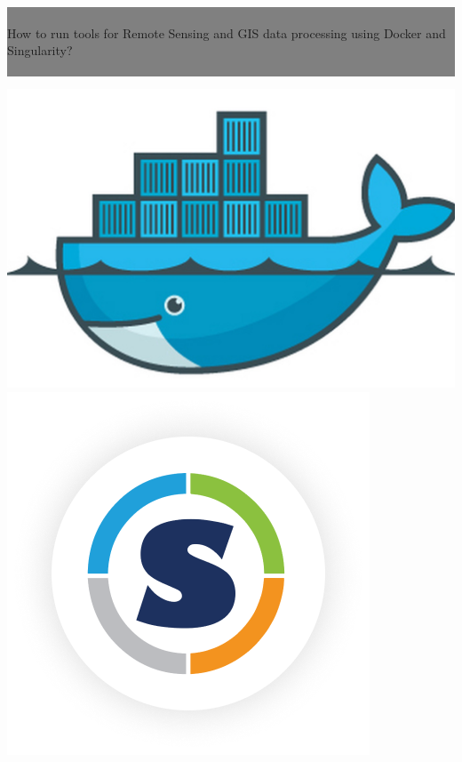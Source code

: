 \documentclass[authoryear, 11pt, oneside]{report}
\begin{document}
\thispagestyle{empty} %


\colorbox{grey}{
	\parbox[t]{1.0\linewidth}{
		\centering \fontsize{150pt}{50pt}\selectfont %
		\vspace*{0.5cm} %
		
		\hfill  \\
		\centering How to run tools for Remote Sensing and GIS data processing using Docker and Singularity?\\
		\hfill  \\
		
		\vspace*{0.5cm} %
	}
}

\begin{center}
	\includegraphics[width=0.55\columnwidth]{./figures/docker.jpeg}
	\includegraphics[width=0.4\columnwidth]{./figures/s-logo.png}
\end{center}


\end{document}
